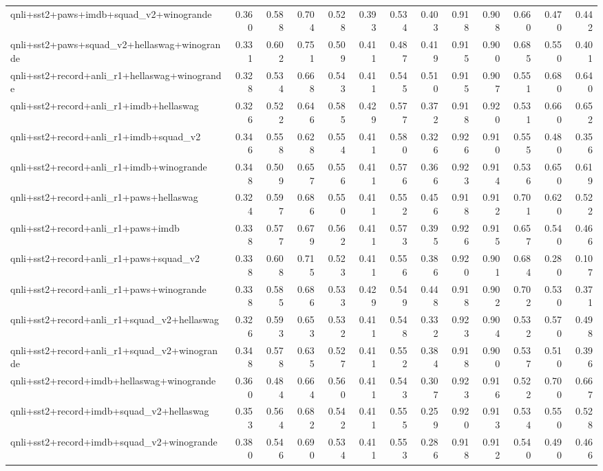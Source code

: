 \begin{table}[t]
\begin{tabular}{lrrrrrrrrrrrr}
    qnli+sst2+paws+imdb+squad\_v2+winogrande & 0.360 & 0.588 & 0.704 & 0.528 & 0.393 & 0.534 & 0.403 & 0.918 & 0.908 & 0.660 & 0.470 & 0.442 \\
    qnli+sst2+paws+squad\_v2+hellaswag+winogrande & 0.331 & 0.602 & 0.751 & 0.509 & 0.411 & 0.487 & 0.419 & 0.915 & 0.900 & 0.685 & 0.550 & 0.401 \\
    qnli+sst2+record+anli\_r1+hellaswag+winogrande & 0.328 & 0.534 & 0.668 & 0.543 & 0.411 & 0.545 & 0.510 & 0.915 & 0.907 & 0.551 & 0.680 & 0.640 \\
    qnli+sst2+record+anli\_r1+imdb+hellaswag & 0.326 & 0.522 & 0.646 & 0.585 & 0.429 & 0.577 & 0.372 & 0.918 & 0.920 & 0.531 & 0.660 & 0.652 \\
    qnli+sst2+record+anli\_r1+imdb+squad\_v2 & 0.346 & 0.558 & 0.628 & 0.554 & 0.411 & 0.580 & 0.326 & 0.926 & 0.910 & 0.555 & 0.480 & 0.356 \\
    qnli+sst2+record+anli\_r1+imdb+winogrande & 0.348 & 0.509 & 0.657 & 0.556 & 0.411 & 0.576 & 0.366 & 0.923 & 0.914 & 0.536 & 0.650 & 0.619 \\
    qnli+sst2+record+anli\_r1+paws+hellaswag & 0.324 & 0.597 & 0.686 & 0.550 & 0.411 & 0.552 & 0.456 & 0.918 & 0.912 & 0.701 & 0.620 & 0.522 \\
    qnli+sst2+record+anli\_r1+paws+imdb & 0.338 & 0.577 & 0.679 & 0.562 & 0.411 & 0.573 & 0.395 & 0.926 & 0.915 & 0.657 & 0.540 & 0.466 \\
    qnli+sst2+record+anli\_r1+paws+squad\_v2 & 0.338 & 0.608 & 0.715 & 0.523 & 0.411 & 0.556 & 0.386 & 0.920 & 0.901 & 0.684 & 0.280 & 0.107 \\
    qnli+sst2+record+anli\_r1+paws+winogrande & 0.338 & 0.585 & 0.686 & 0.533 & 0.429 & 0.549 & 0.448 & 0.918 & 0.902 & 0.702 & 0.530 & 0.371 \\
    qnli+sst2+record+anli\_r1+squad\_v2+hellaswag & 0.326 & 0.593 & 0.653 & 0.532 & 0.411 & 0.548 & 0.332 & 0.923 & 0.904 & 0.532 & 0.570 & 0.498 \\
    qnli+sst2+record+anli\_r1+squad\_v2+winogrande & 0.348 & 0.578 & 0.635 & 0.527 & 0.411 & 0.552 & 0.384 & 0.918 & 0.900 & 0.537 & 0.510 & 0.396 \\
    qnli+sst2+record+imdb+hellaswag+winogrande & 0.360 & 0.484 & 0.664 & 0.560 & 0.411 & 0.543 & 0.307 & 0.923 & 0.916 & 0.522 & 0.700 & 0.667 \\
    qnli+sst2+record+imdb+squad\_v2+hellaswag & 0.353 & 0.564 & 0.682 & 0.542 & 0.411 & 0.555 & 0.259 & 0.920 & 0.913 & 0.534 & 0.550 & 0.528 \\
    qnli+sst2+record+imdb+squad\_v2+winogrande & 0.380 & 0.546 & 0.690 & 0.534 & 0.411 & 0.553 & 0.286 & 0.918 & 0.912 & 0.540 & 0.490 & 0.466 \\

\end{tabular}
\end{table}
